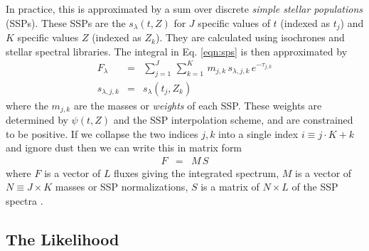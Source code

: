 \documentclass[iop,numberedappendix]{emulateapj}
\begin{document}
In practice, this is approximated by a sum over discrete \emph{simple stellar populations} (SSPs).  
These SSPs are the $s_\lambda(t, Z)$ for $J$ specific values of $t$ (indexed as $t_j$) and $K$ specific values $Z$ (indexed as $Z_k$).
They are calculated using isochrones and stellar spectral libraries.
The integral in Eq. \ref{eqn:sps} is then approximated by 
\begin{eqnarray}
F_\lambda & = & \sum_{j=1}^J \, \sum_{k=1}^{K} \, m_{j,k} \, s_{\lambda, j,k} \, e^{-\tau_{j,k}} \\
s_{\lambda, j,k} & = & s_\lambda(t_j, Z_k)
\end{eqnarray}
where the $m_{j,k}$ are the masses or \emph{weights} of each SSP.  
These weights are determined by $\psi(t, Z)$ and the SSP interpolation scheme, and are constrained to be positive.
If we collapse the two indices $j, k$ into a single index $i \equiv j\cdot K + k$ and ignore dust then we can write this in matrix form
\begin{eqnarray} \label{eqn:sps-matrix}
F & = & M \, S %
\end{eqnarray}
where $F$ is a vector of $L$ fluxes giving the integrated spectrum,
$M$ is a vector of $N\equiv J\times K$ masses or SSP normalizations,
$S$ is a matrix of $N \times L$ of the SSP spectra
.

\subsection{The Likelihood}
\end{document}
